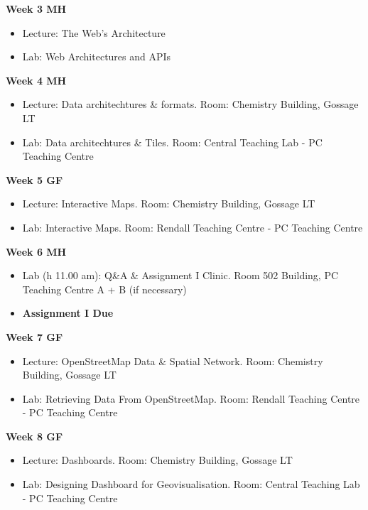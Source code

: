 \documentclass[
  letterpaper,
  DIV=11,
  numbers=noendperiod]{scrreprt}
\begin{document}
\textbf{Week 3 MH}

\begin{itemize}
\item
  Lecture: The Web's Architecture
\item
  Lab: Web Architectures and APIs
\end{itemize}

\textbf{Week 4 MH}

\begin{itemize}
\item
  Lecture: Data architechtures \& formats. Room: Chemistry Building,
  Gossage LT
\item
  Lab: Data architechtures \& Tiles. Room: Central Teaching Lab - PC
  Teaching Centre
\end{itemize}

\textbf{Week 5 GF}

\begin{itemize}
\item
  Lecture: Interactive Maps. Room: Chemistry Building, Gossage LT
\item
  Lab: Interactive Maps. Room: Rendall Teaching Centre - PC Teaching
  Centre
\end{itemize}

\textbf{Week 6 MH}

\begin{itemize}
\item
  Lab (h 11.00 am): Q\&A \& Assignment I Clinic. Room 502 Building, PC
  Teaching Centre A + B (if necessary)
\item
  \textbf{Assignment I Due}
\end{itemize}

\textbf{Week 7 GF}

\begin{itemize}
\item
  Lecture: OpenStreetMap Data \& Spatial Network. Room: Chemistry
  Building, Gossage LT
\item
  Lab: Retrieving Data From OpenStreetMap. Room: Rendall Teaching Centre
  - PC Teaching Centre
\end{itemize}

\textbf{Week 8 GF}

\begin{itemize}
\item
  Lecture: Dashboards. Room: Chemistry Building, Gossage LT
\item
  Lab: Designing Dashboard for Geovisualisation. Room: Central Teaching
  Lab - PC Teaching Centre
\end{itemize}
\end{document}
